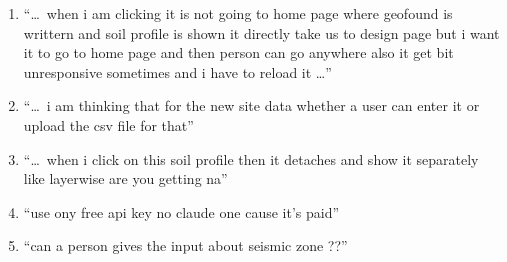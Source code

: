 \documentclass[11pt,a4paper]{article}
\begin{document}
\begin{enumerate}[label=\arabic*.]
\item ``\ldots\ when i am clicking it is not going to home page where geofound is writtern and soil profile is shown it
  directly take us to design page but i want it to go to home page and then person can go anywhere also it get bit
  unresponsive sometimes and i have to reload it \ldots''
\item ``\ldots\ i am thinking that for the new site data whether a user can enter it or upload the csv file for that''
\item ``\ldots\ when i click on this soil profile then it detaches and show it separately like layerwise are you
  getting na''
\item ``use ony free api key no claude one cause it's paid''
\item ``can a person gives the input about seismic zone ??''
\end{enumerate}
\end{document}
